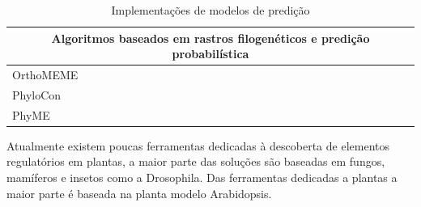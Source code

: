 \begin{table}[h!]
\begin{center}
\begin{tabular}{| l | c | }
    \multicolumn{2}{|c|}{Algoritmos baseados em rastros filogenéticos e predição probabilística}             \\ \hline

    OrthoMEME      & \cite{Carmack2007}  \\ \hline
    PhyloCon       & \cite{Wang2003}     \\ \hline
    PhyME          & \cite{Sinha2004}    \\ \hline

    \hline

  \end{tabular}
\end{center}
  \caption{Implementações de modelos de predição}
\end{table}


Atualmente existem poucas ferramentas dedicadas à descoberta de elementos regulatórios em plantas, a maior parte das soluções são baseadas em fungos, mamíferos e insetos como a Drosophila. Das ferramentas dedicadas a plantas a maior parte é baseada na planta modelo Arabidopsis.